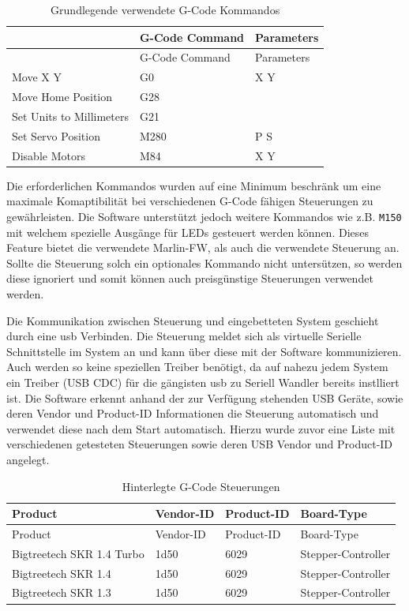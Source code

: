 \begin{longtable}[]{@{}lll@{}}
\caption{Grundlegende verwendete G-Code Kommandos}\tabularnewline
\toprule
& G-Code Command & Parameters\tabularnewline
\midrule
\endfirsthead
\toprule
& G-Code Command & Parameters\tabularnewline
\midrule
\endhead
Move X Y & G0 & X Y\tabularnewline
Move Home Position & G28 &\tabularnewline
Set Units to Millimeters & G21 &\tabularnewline
Set Servo Position & M280 & P S\tabularnewline
Disable Motors & M84 & X Y\tabularnewline
\bottomrule
\end{longtable}

Die erforderlichen Kommandos wurden auf eine Minimum beschränk um eine
maximale Komaptibilität bei verschiedenen G-Code fähigen Steuerungen zu
gewährleisten. Die Software unterstützt jedoch weitere Kommandos wie
z.B. \passthrough{\lstinline!M150!} mit welchem spezielle Ausgänge für
LEDs gesteuert werden können. Dieses Feature bietet die verwendete
Marlin-FW\cite{marlinfw}, als auch die verwendete Steuerung an.
Sollte die Steuerung solch ein optionales Kommando nicht untersützen, so
werden diese ignoriert und somit können auch preisgünstige Steuerungen
verwendet werden.

Die Kommunikation zwischen Steuerung und eingebetteten System geschieht
durch eine \gls{usb} Verbinden. Die Steuerung meldet sich als virtuelle
Serielle Schnittstelle im System an und kann über diese mit der Software
kommunizieren. Auch werden so keine speziellen Treiber benötigt, da auf
nahezu jedem System ein Treiber (USB CDC) für die gängisten \gls{usb} zu
Seriell Wandler bereits instlliert ist. Die Software erkennt anhand der
zur Verfügung stehenden USB Geräte, sowie deren Vendor und Product-ID
Informationen die Steuerung automatisch und verwendet diese nach dem
Start automatisch. Hierzu wurde zuvor eine Liste mit verschiedenen
getesteten Steuerungen sowie deren USB Vendor und Product-ID angelegt.

\begin{longtable}[]{@{}llll@{}}
\caption{Hinterlegte G-Code Steuerungen}\tabularnewline
\toprule
Product & Vendor-ID & Product-ID & Board-Type\tabularnewline
\midrule
\endfirsthead
\toprule
Product & Vendor-ID & Product-ID & Board-Type\tabularnewline
\midrule
\endhead
Bigtreetech SKR 1.4 Turbo & 1d50 & 6029 &
Stepper-Controller\tabularnewline
Bigtreetech SKR 1.4 & 1d50 & 6029 & Stepper-Controller\tabularnewline
Bigtreetech SKR 1.3 & 1d50 & 6029 & Stepper-Controller\tabularnewline
\bottomrule
\end{longtable}

